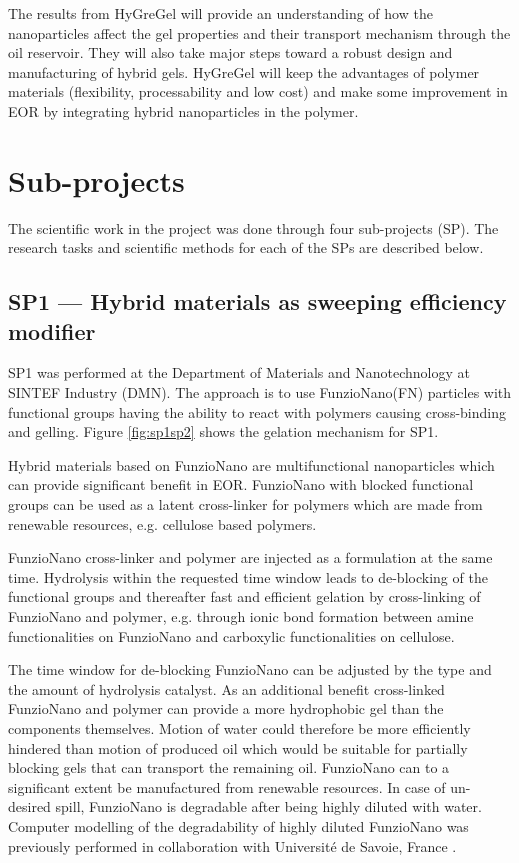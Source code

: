 The results from HyGreGel will provide an understanding of how the nanoparticles affect the gel properties and their transport mechanism through the oil reservoir. They will also take major steps toward a robust design and manufacturing of hybrid gels. HyGreGel will keep the advantages of polymer materials (flexibility, processability and low cost) and make some improvement in EOR by integrating hybrid nanoparticles in the polymer. 

\section{Sub-projects}
The scientific work in the project was done through four sub-projects (SP). The research tasks and scientific methods for each of the SPs are described below.

\subsection*{SP1 --- Hybrid materials as sweeping efficiency modifier}
%

SP1 was performed at the Department of Materials and Nanotechnology at SINTEF Industry (DMN). The approach is to use FunzioNano\texttrademark (FN) particles with functional groups having the ability to react with polymers causing cross-binding and gelling. Figure \ref{fig:sp1sp2} shows the gelation mechanism for SP1.

Hybrid materials based on FunzioNano are multifunctional nanoparticles which can provide significant benefit in EOR. FunzioNano with blocked functional groups can be used as a latent cross-linker for polymers which are made from renewable resources, e.g. cellulose based polymers. 

FunzioNano cross-linker and polymer are injected as a formulation at the same time. Hydrolysis within the requested time window leads to de-blocking of the functional groups and thereafter fast and efficient gelation by cross-linking of FunzioNano and polymer, e.g. through ionic bond formation between amine functionalities on FunzioNano and carboxylic functionalities on cellulose.

The time window for de-blocking FunzioNano can be adjusted by the type and the amount of hydrolysis catalyst. As an additional benefit cross-linked FunzioNano and polymer can provide a more hydrophobic gel than the components themselves. Motion of water could therefore be more efficiently hindered than motion of produced oil which would be suitable for partially blocking gels that can transport the remaining oil. FunzioNano can to a significant extent be manufactured from renewable resources. In case of un-desired spill, FunzioNano is degradable after being highly diluted with water. Computer modelling of the degradability of highly diluted FunzioNano was previously performed in collaboration with Université de Savoie, France \citep{Neyertz2012,Neyertz2013}.

